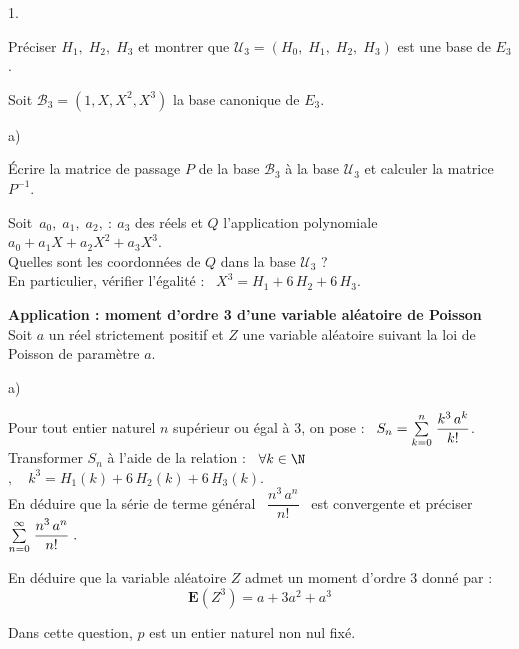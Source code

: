 \documentclass[11pt]{article}%
\begin{document}
\begin{noliste}{1.}
 \setlength{\itemsep}{4mm}
\item Préciser $H_{1},\;H_{2},\;H_{3}$ et montrer que $\mathcal{U}_{3}
= (H_{0},\;H_{1},\; H_{2}, \; H_{3})$ est une base de $E_{3}$.

\item Soit $\mathcal{B}_{3} = (1,X,X^{2},X^{3})$ la base canonique de
$E_{3}$.

\begin{noliste}{a)}
 \setlength{\itemsep}{2mm}
\item Écrire la matrice de passage $P$ de la base $\mathcal{B}_{3}$ à
la
base $\mathcal{U}_{3}$ et calculer la matrice $P^{-1}$.

\item \label{X3} Soit\ $a_{0},\;a_{1},\;a_{2},\ :\ a_{3}$ des réels et
$Q$
l'application polynomiale $a_{0} + a_{1}X + a_{2}X^{2} + a_{3}X^{3}$.
\\
Quelles sont les coordonnées de $Q$ dans la base $\mathcal{U}_{3}$ ?\\
En particulier, vérifier l'égalité : \ $X^{3} = H_{1} + 6\,H_{2} +
6\,H_{3}$.
\end{noliste}

\item \label{Poisson}\textbf{Application : moment d'ordre 3 d'une
variable aléatoire de Poisson}\\
Soit $a$ un réel strictement positif et $Z$ une variable aléatoire
suivant
la loi de Poisson de paramètre $a$.

\begin{noliste}{a)}
 \setlength{\itemsep}{2mm}
\item \label{a} Pour tout entier naturel $n$ supérieur ou égal à $3$,
on
pose : \ $S_{n} = {\textstyle\sum\limits_{k = 0}^{n}}\hspace{.1cm}\dfrac{k^{3}\,a^{k}}{k!}$. \\
Transformer $S_{n}$ à l'aide de la relation : \ $\forall k\in \N$
$,\quad k^{3} = H_{1}(k) + 6\,H_{2}(k) + 6\,H_{3}(k)$.\\
En déduire que la série de terme général \ $\dfrac{n^{3}\,a^{n}}{n!}$ \
est
convergente et préciser \ ${\textstyle\sum\limits_{n = 0}^{\infty
}}\hspace{.1cm}\dfrac{n^{3}\,a^{n}}{n!}\;.$

\item \label{b} En déduire que la variable aléatoire $Z$ admet un
moment
d'ordre $3$ donné par : 
\[
\mathbf{E}(Z^{3}) = a + 3a^{2} + a^{3}
\]
\end{noliste}

\item Dans cette question, $p$ est un entier naturel non nul fixé.


\end{noliste}
\end{document}

